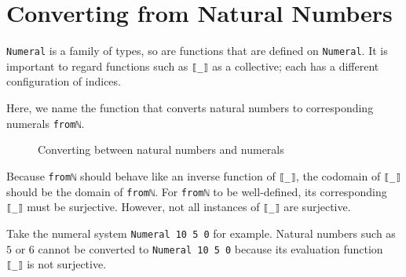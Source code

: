 \documentclass[\main/thesis.tex]{subfiles}
\begin{document}
\section{Converting from Natural Numbers}\label{fromnat}

\lstinline|Numeral| is a family of types, so are functions that are defined on
\lstinline|Numeral|.
It is important to regard functions such as \lstinline|⟦_⟧| as a collective;
each has a different configuration of indices.

Here, we name the function that converts natural numbers to corresponding
numerals \lstinline|fromℕ|.

\begin{figure}[H]
    \centering
\caption{Converting between natural numbers and numerals}
\label{figure:31}
\end{figure}

Because \lstinline|fromℕ| should behave like an inverse function of \lstinline|⟦_⟧|,
the codomain of \lstinline|⟦_⟧| should be the domain of \lstinline|fromℕ|.
For \lstinline|fromℕ| to be well-defined, its corresponding \lstinline|⟦_⟧|
must be surjective.
However, not all instances of \lstinline|⟦_⟧| are surjective.

Take the numeral system \lstinline|Numeral 10 5 0| for example.
Natural numbers such as $ 5 $ or $ 6 $ cannot be converted to
\lstinline|Numeral 10 5 0| because its evaluation function \lstinline|⟦_⟧|
is not surjective.
\end{document}
